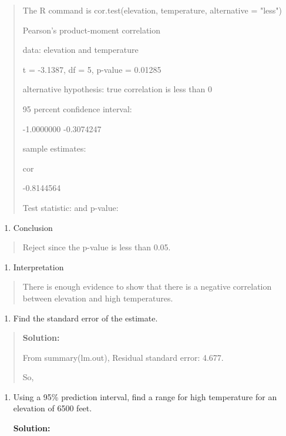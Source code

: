 \documentclass[]{book}
\providecommand{\tightlist}{%
  \setlength{\itemsep}{0pt}\setlength{\parskip}{0pt}}
\begin{document}
\begin{quote}
The R command is cor.test(elevation, temperature, alternative =
"less")

Pearson's product-moment correlation

data: elevation and temperature

t = -3.1387, df = 5, p-value = 0.01285

alternative hypothesis: true correlation is less than 0

95 percent confidence interval:

-1.0000000 -0.3074247

sample estimates:

cor

-0.8144564

Test statistic: and p-value:
\end{quote}

\begin{enumerate}
\def\labelenumi{\arabic{enumi}.}
\setcounter{enumi}{4}
\tightlist
\item
  Conclusion
\end{enumerate}

\begin{quote}
Reject since the p-value is less than 0.05.
\end{quote}

\begin{enumerate}
\def\labelenumi{\arabic{enumi}.}
\setcounter{enumi}{5}
\tightlist
\item
  Interpretation
\end{enumerate}

\begin{quote}
There is enough evidence to show that there is a negative correlation
between elevation and high temperatures.
\end{quote}

\begin{enumerate}
\def\labelenumi{\roman{enumi}.}
\tightlist
\item
  Find the standard error of the estimate.
\end{enumerate}

\begin{quote}
\textbf{Solution:}

From summary(lm.out), Residual standard error: 4.677.

So,
\end{quote}

\begin{enumerate}
\def\labelenumi{\alph{enumi}.}
\setcounter{enumi}{9}
\item
  Using a 95\% prediction interval, find a range for high temperature
  for an elevation of 6500 feet.

  \textbf{Solution:}
\end{enumerate}
\end{document}
